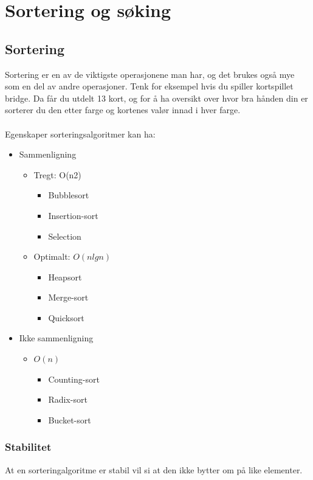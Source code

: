 \section{Sortering og søking}

\subsection{Sortering}
Sortering er en av de viktigste operasjonene man har, og det brukes også mye som en del av andre operasjoner. Tenk for eksempel hvis du spiller kortspillet bridge. Da får du utdelt 13 kort, og for å ha oversikt over hvor bra hånden din er sorterer du den etter farge og kortenes valør innad i hver farge.
\\\\
Egenskaper sorteringsalgoritmer kan ha:
\begin{itemize}
    \item Sammenligning
    \begin{itemize}
        \item Tregt: O(n2)
        \begin{itemize}
            \item Bubblesort
            \item Insertion-sort
            \item Selection
        \end{itemize}
        \item Optimalt: $O(n lg n)$
        \begin{itemize}
            \item Heapsort
            \item Merge-sort
            \item Quicksort
        \end{itemize}
    \end{itemize}
    \item Ikke sammenligning
    \begin{itemize}
        \item $O(n)$
        \begin{itemize}
            \item Counting-sort
            \item Radix-sort
            \item Bucket-sort
        \end{itemize}
    \end{itemize}
\end{itemize}

\subsubsection{Stabilitet}
At en sorteringalgoritme er stabil vil si at den ikke bytter om på like elementer.

